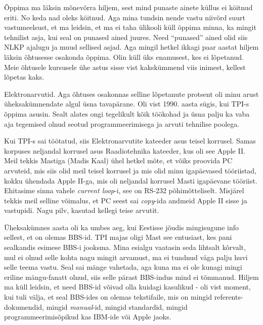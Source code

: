 
Õppima ma läksin mõnevõrra hiljem, sest mind 
punaste ainete küllus ei köitnud eriti. No keda nad oleks köitnud. Aga mina tundsin 
nende vastu niivõrd suurt vastumeelsust,  et ma leidsin, et ma ei taha ülikooli küll 
õppima minna, ka mingit tehnilist asja, kui seal on  punased ained juures. Need 
\enquote{punased} ained olid siis  NLKP ajalugu ja muud sellised asjad. Aga 
mingil hetkel ikkagi paar aastat hiljem läksin õhtusesse osakonda õppima. Olin 
küll üks enamusest, kes ei lõpetanud. Meie õhtusele kursusele ühe astus sisse vist 
kakskümmend viis inimest, kellest lõpetas kaks. 


Elektronarvutid. Aga õhtuses osakonnas selline lõpetanute protsent oli minu 
arust üheksakümnendate algul üsna tavapärane. Oli vist 1990. aasta sügis, kui 
TPI-s õppima asusin. Sealt alates ongi tegelikult kõik töökohad ja 
 üsna palju ka vaba aja tegemised  olnud seotud programmeerimisega ja 
 arvuti tehnilise  poolega.

Kui  TPI-s sai töötatud, siis Elektronarvutite kateeder asus teisel korrusel. 
Samas korpuses neljandal korrusel asus  Raadiotehnika 
kateeder, kus oli see Apple II. Meil tekkis 
Mastiga (Madis Kaal) 
ühel hetkel  mõte, et võiks proovida PC arvuteid, mis siis olid 
meil teisel korrusel ja mis olid minu igapäevased tööriistad, kokku 
ühendada  Apple II-ga, mis oli neljandal korrusel Masti igapäevane tööriist. 
Ehitasime sinna vahele \emph{current loop}-i, see on RS-232 põhimõtteliselt. 
Misjärel tekkis meil  selline 
võimalus, et PC seest sai \emph{copy}-ida  andmeid Apple II sisse ja vastupidi. 
Nagu pilv, kasutad kellegi teise arvutit. 

Üheksakümnes aasta oli ka umbes aeg, kui Eestisse jõudis mingisugune info 
sellest, et on olemas BBS-id. TPI majas oligi Mast  see 
entusiast, kes pani sealkandis esimese BBS-i jooksma. Mina esialgu vaatasin 
seda lihtsalt kõrvalt, mul ei olnud selle kohta nagu mingit arvamust,  ma ei 
tundnud  väga palju huvi selle teema vastu. Seal sai mänge vahetada, 
aga kuna ma ei ole kunagi mingi eriline mängu-fanatt olnud, siis selle pärast
BBS-indus mind ei tõmmanud. Hiljem ma küll 
leidsin, et need BBS-id võivad olla kuidagi kasulikud - oli vist moment, 
kui tuli välja, et seal BBS-ides on olemas  tekstifaile, mis on mingid 
referents-dokumendid, mingid \emph{manual}-id, mingid standardid, mingid 
programmeerimisõpikud kas IBM-ide või Apple jaoks.

